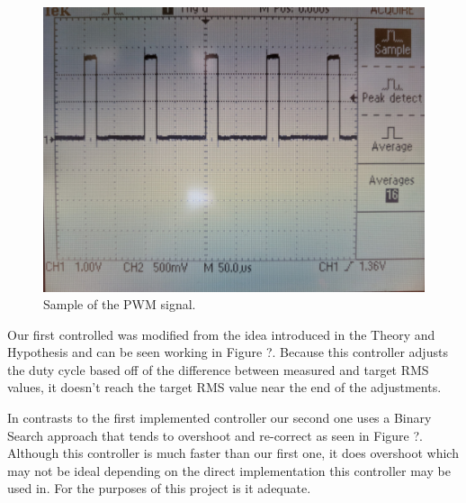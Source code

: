 \begin{figure}[h]
\centering
\includegraphics[scale=0.1]{images/pwm_duty_cycle.jpg}
\caption{\label{fig:PWM_duty_cycle} Sample of the PWM signal.}
\end{figure}


Our first controlled was modified from the idea introduced in the Theory and Hypothesis and can be seen working in Figure ?. Because this controller adjusts the duty cycle based off of the difference between measured and target RMS values, it doesn't reach the target RMS value near the end of the adjustments.




In contrasts to the first implemented controller our second one uses a Binary Search approach that tends to overshoot and re-correct as seen in Figure ?. Although this controller is much faster than our first one, it does overshoot which may not be ideal depending on the direct implementation this controller may be used in. For the purposes of this project is it adequate.
